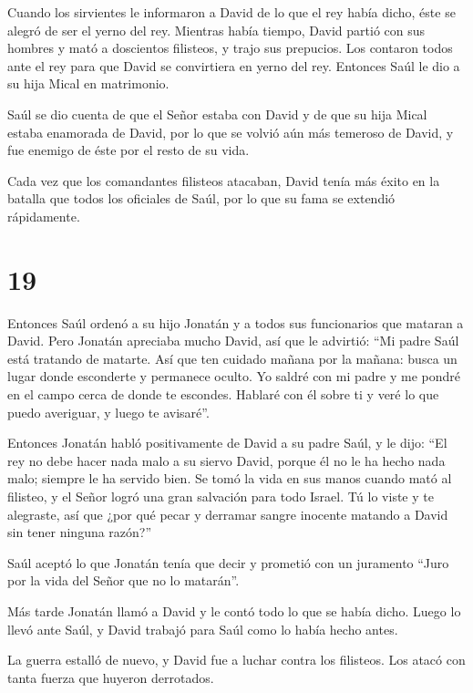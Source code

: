  Cuando los sirvientes le informaron a David de lo que el
rey había dicho, éste se alegró de ser el yerno del rey. Mientras había
tiempo,  David partió con sus hombres y mató a doscientos
filisteos, y trajo sus prepucios. Los contaron todos ante el rey para
que David se convirtiera en yerno del rey. Entonces Saúl le dio a su
hija Mical en matrimonio.

 Saúl se dio cuenta de que el Señor estaba con David y de
que su hija Mical estaba enamorada de David,  por lo que se
volvió aún más temeroso de David, y fue enemigo de éste por el resto de
su vida.

 Cada vez que los comandantes filisteos atacaban, David
tenía más éxito en la batalla que todos los oficiales de Saúl, por lo
que su fama se extendió rápidamente.

\hypertarget{section-18}{%
\section{19}\label{section-18}}

 Entonces Saúl ordenó a su hijo Jonatán y a todos sus
funcionarios que mataran a David. Pero Jonatán apreciaba mucho David,
 así que le advirtió: ``Mi padre Saúl está tratando de
matarte. Así que ten cuidado mañana por la mañana: busca un lugar donde
esconderte y permanece oculto.  Yo saldré con mi padre y me
pondré en el campo cerca de donde te escondes. Hablaré con él sobre ti y
veré lo que puedo averiguar, y luego te avisaré''.

 Entonces Jonatán habló positivamente de David a su padre
Saúl, y le dijo: ``El rey no debe hacer nada malo a su siervo David,
porque él no le ha hecho nada malo; siempre le ha servido bien.
 Se tomó la vida en sus manos cuando mató al filisteo, y el
Señor logró una gran salvación para todo Israel. Tú lo viste y te
alegraste, así que ¿por qué pecar y derramar sangre inocente matando a
David sin tener ninguna razón?''

 Saúl aceptó lo que Jonatán tenía que decir y prometió con
un juramento ``Juro por la vida del Señor que no lo matarán''.

 Más tarde Jonatán llamó a David y le contó todo lo que se
había dicho. Luego lo llevó ante Saúl, y David trabajó para Saúl como lo
había hecho antes.

 La guerra estalló de nuevo, y David fue a luchar contra los
filisteos. Los atacó con tanta fuerza que huyeron derrotados.

